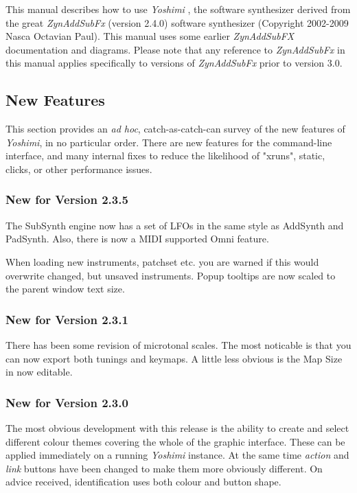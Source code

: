 \documentclass[
 11pt,
 twoside,
 a4paper,
 final                                 %
]{article}
\begin{document}
   This manual describes how to use \textsl{Yoshimi} \cite{yoshimi},
   the software synthesizer derived from the great
   \textsl{ZynAddSubFx} (version 2.4.0) \cite{zynaddsubfx} software
   synthesizer (Copyright 2002-2009 Nasca Octavian Paul).
   This manual uses some earlier \textsl{ZynAddSubFX} documentation and
   diagrams.  Please note that any reference to \textsl{ZynAddSubFx}
   in this manual applies specifically to versions of \textsl{ZynAddSubFx}
   prior to version 3.0.

\subsection{New Features}
\label{subsec:introduction_new_features}

   This section provides an \textsl{ad hoc}, catch-as-catch-can survey of the
   new features of \textsl{Yoshimi}, in no particular order.
   There are new features for the command-line interface, and many internal
   fixes to reduce the likelihood of "xruns", static, clicks, or other
   performance issues.

\subsubsection{New for Version 2.3.5}
\label{subsubsec:new_features_2_3_5}
The SubSynth engine now has a set of LFOs in the same style as AddSynth and PadSynth. Also, there is now a MIDI supported Omni feature.

When loading new instruments, patchset etc. you are warned if this would overwrite changed, but unsaved instruments.
Popup tooltips are now scaled to the parent window text size.

\subsubsection{New for Version 2.3.1}
\label{subsubsec:new_features_2_3_1}
There has been some revision of microtonal scales. The most noticable is that you can now export both tunings and keymaps. A little less obvious is the Map Size in now editable.

\subsubsection{New for Version 2.3.0}
\label{subsubsec:new_features_2_3_0}
The most obvious development with this release is the ability to create and select different colour themes covering the whole of the graphic interface. These can be applied immediately on a running \textsl{Yoshimi} instance. At the same time \textsl{action} and \textsl{link} buttons have been changed to make them more obviously different. On advice received, identification uses both colour and button shape.
\end{document}
